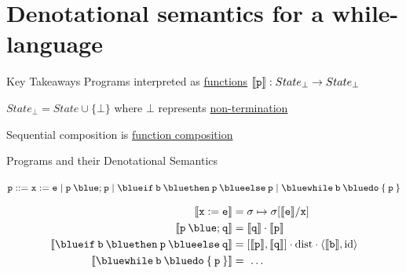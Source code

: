 \documentclass{beamer}
\begin{document}
\section{Denotational semantics for a while-language}

\begin{frame}{Key Takeaways}
        Programs interpreted as \alert{\underline{functions}}
        $\llbracket \mathtt{p} \rrbracket : State_\bot \to State_\bot$

        $State_\bot = State \cup \{ \bot \}$ where $\bot$ represents
        \alert{\underline{non-termination}}

        Sequential composition is \alert{\underline{function composition}}
\end{frame}

\begin{frame}{Programs and their Denotational Semantics}

        \begin{block}{\vspace*{-3.5ex}}
        \begin{center}
        $\prog{p} ::= \mathtt{x} := \mathtt{e} \mid
	\mathtt{p \> {\blue ;} \> p} \mid
	\mathtt{{\blue if} \> b \> {\blue then} \> p \> {\blue else} \> p} \mid
	\mathtt{{\blue while} \> b \> {\blue do} \> \{ \> p \> \}}$
        \end{center}
	\end{block}
        \vspace{-0.5cm}
        \begin{align*}
                \sem{\prog{x : = e}} & = \sigma \mapsto \sigma[\sem{\prog{e}}/\prog{x}] \\
                \sem{\prog{p} \> {\blue ;} \> \prog{q}} & 
                = \sem{\prog{q}} \comp \sem{\prog{p}} \\
                \sem{\mathtt{{\blue if} \> b \> {\blue then} \> p \> {\blue else} \> q}}
                                                        & 
                                                        = [\sem{\prog{p}},\sem{\prog{q}}] \comp
                                                        \mathrm{dist} \comp \pv{\sem{\prog{b}}}{\id}
                \\
                \sem{\mathtt{{\blue while} \> b \> {\blue do} \> \{ \> p \> \}} }
                                                        & =\  \dots
        \end{align*}
\end{frame}
\end{document}
